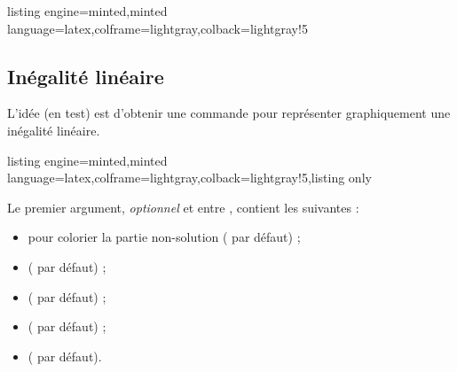 \documentclass[11pt,a4paper]{ltxdoc}
\begin{document}
\begin{tcblisting}{listing engine=minted,minted language=latex,colframe=lightgray,colback=lightgray!5}
\begin{GraphiqueTikz}[x=4cm,y=3cm,Xmin=0,Xmax=2.5,Xgrille=1,Xgrilles=0.25,
  Ymin=0,Ymax=1.25,Ygrille=0.5,Ygrilles=0.25]
\end{GraphiqueTikz}
\end{tcblisting}

\pagebreak

\subsection{Inégalité linéaire}\label{ineglin}

L'idée (en test) est d'obtenir une commande pour représenter graphiquement une inégalité linéaire.

\begin{tcblisting}{listing engine=minted,minted language=latex,colframe=lightgray,colback=lightgray!5,listing only}
\end{tcblisting}

Le premier argument, \textit{optionnel} et entre \MontreCode{[...]}, contient les  suivantes :

\begin{itemize}
  \item {} pour colorier la partie non-solution ( par défaut) ;
  \item {} ( par défaut) ;
  \item {} ( par défaut) ;
  \item {} ( par défaut) ;
  \item {} ( par défaut).
\end{itemize}
\end{document}
